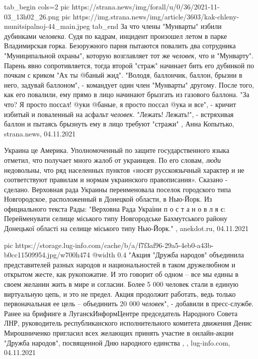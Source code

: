 \ifcmt
  tab_begin cols=2
     pic https://strana.news/img/forall/u/0/36/2021-11-03_13h02_26.png
     pic https://img.strana.news/img/article/3603/kak-chleny-munitsipalnoj-44_main.jpeg
  tab_end
\fi
За что члены "Мунварты" избили дубинками \emph{человека}.  Судя по кадрам,
инцидент произошел летом в парке Владимирская горка.  Безоружного парня
пытаются повалить два сотрудника "Муниципальной охраны", которую возглавляет
тот же \emph{человек}, что и "Мунварту".  Парень явно сопротивляется, тогда
второй "страж" начинает бить его дубинкой по почкам с криком "Ах ты @баный
жид".  "Володя, баллончик, баллон, брызни в него, задувай баллоном", -
командует один член "Мунварты" другому. После того, как его повалили, ему прямо
в лицо начинают брызгать из газового баллона.  "За что? Я просто поссал! @уки
@баные, я просто поссал @ука и все", - кричит избитый и поваленный на асфальт
\emph{человек}.  "Лежать! Лежать!", - встряхивая баллон и пытаясь брызнуть ему
в лицо требуют "стражи"
, 
Анна Копытько, strana.news, 04.11.2021

Украина це Америка. Уполномоченный по защите государственного языка отметил,
что получает много жалоб от украинцев. По его словам, \emph{люди} недовольны,
что ряд населенных пунктов «носят русскоязычный характер и не соответствуют
правилам и нормам украинского правописания».  Сказано - сделано.  Верховная
рада Украины переименовала поселок городского типа Новгородское, расположенный
в Донецкой области, в Нью-Йорк. Из официального текста Рады: "Верховна Рада
України п о с т а н о в л я є: Перейменувати селище міського типу Новгородське
Бахмутського району Донецької області на селище міського типу Нью-Йорк."
, anekdot.ru, 04.11.2021

\ifcmt
  pic https://storage.lug-info.com/cache/b/a/f7f3af96-29a5-4eb0-a43b-b0cc11509954.jpg/w700h474
  @width 0.4
\fi
"Акция "Дружба народов" объединила представителей разных народов и
национальностей в таком дружелюбном и открытом жесте, как рукопожатие. И это
говорит об одном – все мы едины в своем желании жить в мире и согласии. Более 5
000 человек стали в единую виртуальную цепь, и это не предел. Акция продолжит
работать, ведь только первоначальная ее цель – объединить 20 000
\emph{человек}", - добавили в пресс-службе.  Ранее на брифинге в
ЛуганскИнформЦентре председатель Народного Совета ЛНР, руководитель
республиканского исполнительного комитета движения Денис Мирошниченко пригласил
всех желающих принять участие в онлайн-акции "Дружба народов", посвященной Дню
народного единства
, , lug-info.com, 04.11.2021

